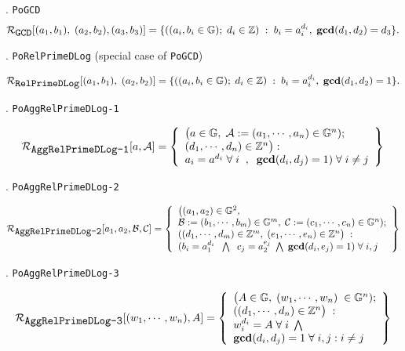 \documentclass[11pt, lettersize, notitlepage, leqno, footskip=0.6cm]{article}
\newcommand{\bz}{\mathbb Z}
\newcommand{\mc}{\mathcal}
\newcommand{\mb}{\mathbb}
\newcommand{\mbf}{\mathbf}
\newcommand{\noin}{\noindent}
\newcommand{\GCD}{\mbf{gcd}}
\numberwithin{equation}{section}
\begin{document}
{\noin 8. \verb|PoGCD| \vspace{-0.2cm}
$$\mc{R}_{{\protect\verb|GCD|}}[(a_1,b_1),\; (a_2,b_2),(a_3,b_3)] = \{((a_i, b_i\in\mb{G});\;d_i\in\bz)\;:\; b_i = a_i^{d_i},\;\GCD(d_1,d_2)=d_3  \} .$$


\noin 9. \verb|PoRelPrimeDLog| (special case of \verb|PoGCD|) \vspace{-0.7cm}

\[
\mc{R}_{{\protect\verb|RelPrimeDLog|}}[(a_1,b_1),\;(a_2,b_2)] = \{((a_i, b_i\in\mb{G});\;d_i\in\bz)\;:\; b_i = a_i^{d_i},\;\GCD(d_1,d_2)=1 \} .
\]

\noin 10. \verb|PoAggRelPrimeDLog-1| \vspace{-0.2cm}

\[
  \mc{R}_{{\protect\verb|AggRelPrimeDLog-1|}}[a, \mc{A}] = \left\{\begin{array}{l}
    \big(a\in\mb{G},\;  \mc{A}:=(a_1,\cdots, a_n)\in\mb{G}^n);\\
    (d_1,\cdots,d_n)\in\bz^n\big): \\
    a_i = a^{d_i}\;\forall\;i\;\;,\;\; \GCD(d_i, d_j) = 1)\;\forall \;i\neq j   	
  \end{array}\right\}
\] 

\noin 11. \verb|PoAggRelPrimeDLog-2| \vspace{-0.6cm}

\[
  \mc{R}_{{\protect\verb|AggRelPrimeDLog-2|}}[a_1, a_2, \mc{B}, \mc{C}] = \left\{\begin{array}{l}
    \big((a_1,a_2)\in\mb{G}^2,\;\\
     \mc{B}:=(b_1,\cdots, b_m)\in\mb{G}^m,\;\mc{C}:= (c_1,\cdots, c_n)\in\mb{G}^n);\\
    ((d_1,\cdots,d_m)\in\bz^m,\; (e_1,\cdots,e_n)\in\bz^n\big)\;: \\
    (b_i = a_1^{d_i}\;\;\bigwedge\;\; c_j = a_2^{e_j}\;\bigwedge\; \GCD(d_i, e_j) = 1)\;\forall \;i,j   	
  \end{array}\right\}
\] 

\noin 12. \verb|PoAggRelPrimeDLog-3| \vspace{-0.3cm}

\[
  \mc{R}_{{\protect\verb|AggRelPrimeDLog-3|}}[(w_1,\cdots, w_n), A] = \left\{\begin{array}{l}
    \big(A\in\mb{G},\; (w_1,\cdots, w_n)\;\in\mb{G}^n);\\
    ((d_1,\cdots,d_n)\in\bz^n\big)\;: \\
    w_i^{d_i} = A\;\forall\;i\;\bigwedge  \\
   	\GCD(d_i, d_j) = 1\;\forall \;i,j: i\neq j
  \end{array}\right\}
\] 

}
\end{document}

